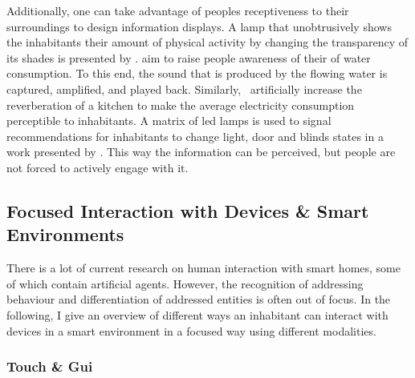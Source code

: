 Additionally, one can take advantage of peoples receptiveness to their surroundings to design information displays.
A lamp that unobtrusively shows the inhabitants their amount of physical activity by changing the transparency of its shades is presented by .
 aim to raise people awareness of their of water consumption.
To this end, the sound that is produced by the flowing water is captured, amplified, and played back.
Similarly,~ artificially increase the reverberation of a kitchen to make the average electricity consumption perceptible to inhabitants.
A matrix of led lamps is used to signal recommendations for inhabitants to change light, door and blinds states in a work presented by .
This way the information can be perceived, but people are not forced to actively engage with it.

\subsection[Focused Interaction]{Focused Interaction with Devices \& Smart Environments}\label{sec.rw.hi.focused-dev-rw}

There is a lot of current research on human interaction with \glspl{smart home}, some of which contain \glspl{artificial agent}.
However, the recognition of addressing behaviour and differentiation of addressed entities is often out of focus.
In the following, I give an overview of different ways an inhabitant can interact with \glspl{device} in a \gls{smart environment} in a focused way using different modalities.

\subsubsection{Touch \& Gui}\label{sec.rw.hi.focused-dev-rw.touch}

